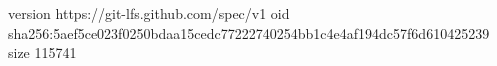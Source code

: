 version https://git-lfs.github.com/spec/v1
oid sha256:5aef5ce023f0250bdaa15cedc77222740254bb1c4e4af194dc57f6d610425239
size 115741

